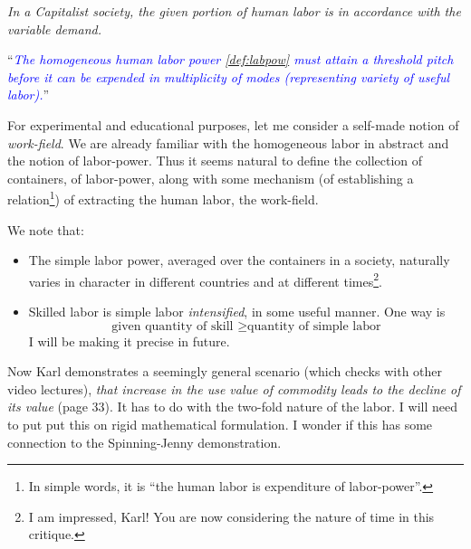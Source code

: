 \documentclass[12pt]{extarticle}
\theoremstyle{definition}
\newenvironment{remark}[1][Remark]{\begin{trivlist}
\item[\hskip \labelsep {\bfseries #1}]}{\end{trivlist}}
\begin{document}
\emph{In a Capitalist society, the given portion of human labor is in accordance with the variable demand.}

``\emph{\textcolor{blue}{The homogeneous human labor power \ref{def:labpow} must attain a threshold pitch before it can be expended in multiplicity of modes (representing variety of useful labor).}}''

For experimental and educational purposes, let me consider a self-made notion of \emph{work-field}.  We are already familiar with the homogeneous labor in abstract and the notion of labor-power.  Thus it seems natural to define the collection of containers, of labor-power, along with some mechanism (of establishing a relation\footnote{In simple words, it is ``the human labor is expenditure of labor-power''.}) of extracting the human labor, the work-field.
\begin{remark}
  We note that:
  \begin{itemize}
  \item The simple labor power, averaged over the containers in a society, naturally varies in character in different countries and at different times\footnote{I am impressed, Karl!  You are now considering the nature of time in this critique.}.
  \item Skilled labor is simple labor \emph{intensified}, in some useful manner.  One way is
    \begin{equation}
      \text{given quantity of skill } \geq \text{quantity of simple labor}
    \end{equation}
    I will be making it precise in future.
  \end{itemize}
\end{remark}

Now Karl demonstrates a seemingly general scenario (which checks with other video lectures), \emph{that increase in the use value of commodity leads to the decline of its value} (page 33).  It has to do with the two-fold nature of the labor.  I will need to put put this on rigid mathematical formulation.  I wonder if this has some connection to the Spinning-Jenny demonstration.
\end{document}
